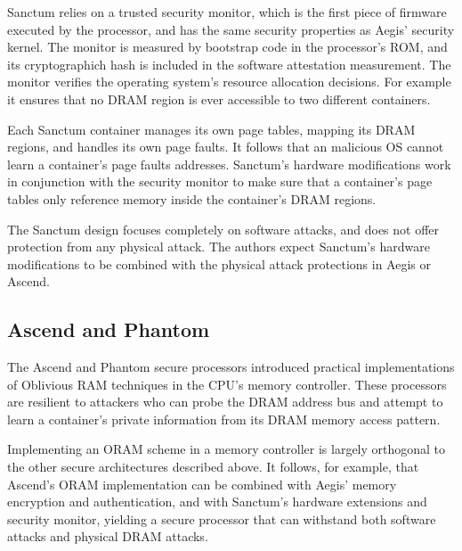 Sanctum relies on a trusted security monitor, which is the first piece of
firmware executed by the processor, and has the same security properties as
Aegis' security kernel. The monitor is measured by bootstrap code in the
processor's ROM, and its cryptographich hash is included in the software
attestation measurement. The monitor verifies the operating system's resource
allocation decisions. For example it ensures that no DRAM region is ever
accessible to two different containers.

Each Sanctum container manages its own page tables, mapping its DRAM regions,
and handles its own page faults. It follows that an malicious OS cannot learn
a container's page faults addresses. Sanctum's hardware modifications work in
conjunction with the security monitor to make sure that a container's page
tables only reference memory inside the container's DRAM regions.

The Sanctum design focuses completely on software attacks, and does not offer
protection from any physical attack. The authors expect Sanctum's hardware
modifications to be combined with the physical attack protections in Aegis or
Ascend.


\subsection{Ascend and Phantom}

The Ascend \cite{fletcher2012ascend} and Phantom \cite{maas2013phantom} secure
processors introduced practical implementations of Oblivious RAM
\cite{goldreich1987oram} techniques in the CPU's memory controller. These
processors are resilient to attackers who can probe the DRAM address bus and
attempt to learn a container's private information from its DRAM memory access
pattern.

Implementing an ORAM scheme in a memory controller is largely orthogonal to the
other secure architectures described above. It follows, for example, that
Ascend's ORAM implementation can be combined with Aegis' memory encryption and
authentication, and with Sanctum's hardware extensions and security monitor,
yielding a secure processor that can withstand both software attacks and
physical DRAM attacks.
